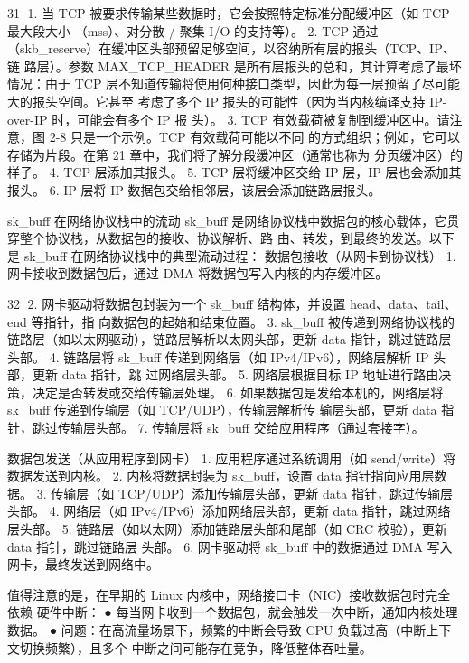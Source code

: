                                                               31
1. 当 TCP 被要求传输某些数据时，它会按照特定标准分配缓冲区（如 TCP 最大段大小
   （mss）、对分散 / 聚集 I/O 的支持等）。
2. TCP 通过（skb_reserve）在缓冲区头部预留足够空间，以容纳所有层的报头（TCP、IP、链
   路层）。参数 MAX_TCP_HEADER 是所有层报头的总和，其计算考虑了最坏情况：由于
   TCP 层不知道传输将使用何种接口类型，因此为每一层预留了尽可能大的报头空间。它甚至
   考虑了多个 IP 报头的可能性（因为当内核编译支持 IP-over-IP 时，可能会有多个 IP 报
   头）。
3. TCP 有效载荷被复制到缓冲区中。请注意，图 2-8 只是一个示例。TCP 有效载荷可能以不同
   的方式组织；例如，它可以存储为片段。在第 21 章中，我们将了解分段缓冲区（通常也称为
   分页缓冲区）的样子。
4. TCP 层添加其报头。
5. TCP 层将缓冲区交给 IP 层，IP 层也会添加其报头。
6. IP 层将 IP 数据包交给相邻层，该层会添加链路层报头。



sk_buff 在网络协议栈中的流动
   sk_buff 是网络协议栈中数据包的核心载体，它贯穿整个协议栈，从数据包的接收、协议解析、路
由、转发，到最终的发送。以下是 sk_buff 在网络协议栈中的典型流动过程：
数据包接收（从网卡到协议栈）
 1. 网卡接收到数据包后，通过 DMA 将数据包写入内核的内存缓冲区。

                                                     32
2. 网卡驱动将数据包封装为一个 sk_buff 结构体，并设置 head、data、tail、end 等指针，指
   向数据包的起始和结束位置。
3. sk_buff 被传递到网络协议栈的链路层（如以太网驱动），链路层解析以太网头部，更新
   data 指针，跳过链路层头部。
4. 链路层将 sk_buff 传递到网络层（如 IPv4/IPv6），网络层解析 IP 头部，更新 data 指针，跳
   过网络层头部。
5. 网络层根据目标 IP 地址进行路由决策，决定是否转发或交给传输层处理。
6. 如果数据包是发给本机的，网络层将 sk_buff 传递到传输层（如 TCP/UDP），传输层解析传
   输层头部，更新 data 指针，跳过传输层头部。
7. 传输层将 sk_buff 交给应用程序（通过套接字）。



数据包发送（从应用程序到网卡）
 1. 应用程序通过系统调用（如 send/write）将数据发送到内核。
 2. 内核将数据封装为 sk_buff，设置 data 指针指向应用层数据。
 3. 传输层（如 TCP/UDP）添加传输层头部，更新 data 指针，跳过传输层头部。
 4. 网络层（如 IPv4/IPv6）添加网络层头部，更新 data 指针，跳过网络层头部。
 5. 链路层（如以太网）添加链路层头部和尾部（如 CRC 校验），更新 data 指针，跳过链路层
    头部。
 6. 网卡驱动将 sk_buff 中的数据通过 DMA 写入网卡，最终发送到网络中。



值得注意的是，在早期的 Linux 内核中，网络接口卡（NIC）接收数据包时完全依赖 硬件中断：
● 每当网卡收到一个数据包，就会触发一次中断，通知内核处理数据。
● 问题：在高流量场景下，频繁的中断会导致 CPU 负载过高（中断上下文切换频繁），且多个
  中断之间可能存在竞争，降低整体吞吐量。

